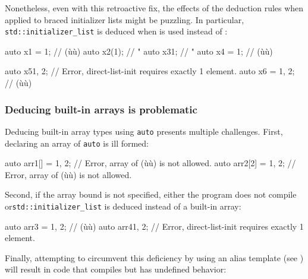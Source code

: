 Nonetheless, even with this retroactive fix, the effects of the
deduction rules when applied to braced initializer lists might be
puzzling. In particular, \lstinline!std::initializer_list! is deduced when
 is used instead of
:

\begin{emcppslisting}[language=C++]
auto x1 = 1;    // (ù{}ù)
auto x2(1);     //   "
auto x3{1};     //   "
auto x4 = {1};  // (ù{}ù)

auto x5{1, 2};     // Error, direct-list-init requires exactly 1 element.
auto x6 = {1, 2};  // (ù{}ù)
\end{emcppslisting}
    

\subsubsection[Deducing built-in arrays is problematic]{Deducing built-in arrays is problematic}\label{deducing-built-in-arrays-is-problematic}

Deducing built-in array types using \lstinline!auto! presents multiple
challenges. First, declaring an array of \lstinline!auto! is ill formed:

\begin{emcppslisting}[language=C++]
auto arr1[]  = {1, 2};  // Error, array of (ù{}ù) is not allowed.
auto arr2[2] = {1, 2};  // Error, array of (ù{}ù) is not allowed.
\end{emcppslisting}
    
\noindent Second, if the array bound is not specified, either the program does not
compile or\linebreak[4]%
 \lstinline!std::initializer_list! is deduced instead of a
built-in array:

\begin{emcppslisting}[language=C++]
auto arr3 = {1, 2};  // (ù{}ù)
auto arr4{1, 2};     // Error, direct-list-init requires exactly 1 element.
\end{emcppslisting}
    
\noindent Finally, attempting to circumvent this deficiency by using an alias
template (see ) will result in code that
compiles but has undefined behavior:

